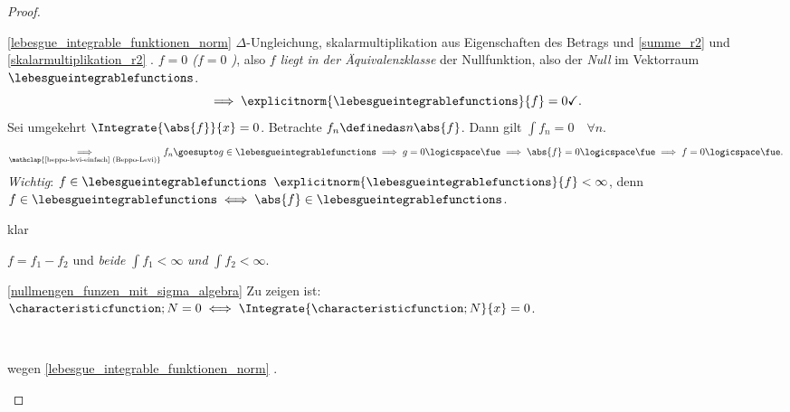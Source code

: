 \begin{proof}
  \begin{proofdescription}
    \item[\ref{lebesgue_integrable_funktionen_norm}] \( \Delta \)-Ungleichung, skalarmultiplikation aus Eigenschaften des Betrags und \ref{summe_r2} und \ref{skalarmultiplikation_r2} \checkmark. \emph{\( f=0 \) (\dh \( f=0 \) \fue)}, also \emph{\( f \) liegt in der Äquivalenzklasse} der Nullfunktion, also der \emph{Null} im Vektorraum \( \lebesgueintegrablefunctions \).
    \begin{equation*}
      \implies \explicitnorm{\lebesgueintegrablefunctions}{f}=0 \checkmark.
    \end{equation*}
    Sei umgekehrt \( \Integrate{\abs{f}}{x}=0 \). Betrachte \( f_n\definedas n\abs{f} \). Dann gilt \( \int f_n=0\quad \forall n\).
    \begin{equation*}
      \underset{\mathclap{\text{\ref{beppo-levi-einfach} (Beppo-Levi)}}}{\implies}f_n\goesupto g\in \lebesgueintegrablefunctions\implies g=0 \logicspace \text{\fue} \implies \abs{f}=0\logicspace \text{\fue}\implies f=0\logicspace \text{\fue}.
    \end{equation*}
    \emph{Wichtig}: \( f\in \lebesgueintegrablefunctions \) \timplies \( \explicitnorm{\lebesgueintegrablefunctions}{f}<\infty \), denn \( f\in \lebesgueintegrablefunctions\iff \abs{f}\in\lebesgueintegrablefunctions \). \begin{proofdescription}
      \item[\rueck] klar 
      \item[\hin] \( f=f_1-f_2 \) und \emph{beide} \( \int f_1<\infty \) \emph{und} \( \int f_2<\infty \). 
    \end{proofdescription}
    \item[\ref{nullmengen_funzen_mit_sigma_algebra}] Zu zeigen ist: \( \characteristicfunction;{N}=0\iff \Integrate{\characteristicfunction;{N}}{x}=0 \).
    \begin{proofdescription}
      \item[\hin] \checkmark\\
      \item[\rueck] wegen \ref{lebesgue_integrable_funktionen_norm} \checkmark. 
    \end{proofdescription}
  \end{proofdescription}
\end{proof}
